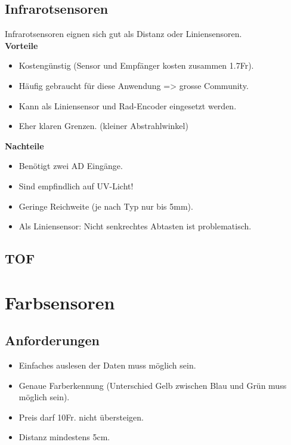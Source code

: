 \subsection{Infrarotsensoren}
Infrarotsensoren eignen sich gut als Distanz oder Liniensensoren.\\
\textbf {Vorteile}
\begin{itemize}
\item Kostengünstig (Sensor und Empfänger kosten zusammen 1.7Fr).
\item Häufig gebraucht für diese Anwendung => grosse Community.
\item Kann als Liniensensor und Rad-Encoder eingesetzt werden.
\item Eher klaren Grenzen. (kleiner Abstrahlwinkel)\\
\end{itemize}
\textbf {Nachteile}
\begin{itemize}
\item Benötigt zwei AD Eingänge.
\item Sind empfindlich auf UV-Licht!
\item Geringe Reichweite (je nach Typ nur bis 5mm).
\item Als Liniensensor: Nicht senkrechtes Abtasten ist problematisch.
\end{itemize}

\subsection{TOF}

\section{Farbsensoren}
\subsection{Anforderungen}
\begin{itemize}
\item Einfaches auslesen der Daten muss möglich sein.
\item Genaue Farberkennung (Unterschied Gelb zwischen Blau und Grün muss möglich sein).
\item Preis darf 10Fr. nicht übersteigen.
\item Distanz mindestens 5cm.
\end{itemize}

